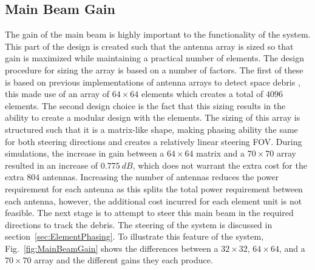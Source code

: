 \documentclass[11pt]{witseiepaper}
\begin{document}
\begin{bibunit}[witseie]
\subsection{Main Beam Gain} \label{sec:MainBeamGain}
The gain of the main beam is highly important to the functionality of the system. This part of the design is created such that the antenna array is sized so that gain is maximized while maintaining a practical number of elements.
The design procedure for sizing the array is based on a number of factors. The first of these is based on previous implementations of antenna arrays to detect space debris \cite{AMISR}, this made use of an array of $64 \times 64$ elements which creates a total of $4096$ elements.
The second design choice is the fact that this sizing results in the ability to create a modular design with the elements. The sizing of this array is structured such that it is a matrix-like shape, making phasing ability the same for both steering directions and creates a relatively linear steering FOV.
During simulations, the increase in gain between a $64 \times 64$ matrix and a $70 \times 70$ array resulted in an increase of $0.775~dB$, which does not warrant the extra cost for the extra $804$ antennas.
Increasing the number of antennas reduces the power requirement for each antenna as this splits the total power requirement between each antenna, however, the additional cost incurred for each element unit is not feasible.
The next stage is to attempt to steer this main beam in the required directions to track the debris. The steering of the system is discussed in section~\ref{sec:ElementPhasing}.
To illustrate this feature of the system, Fig.~\ref{fig:MainBeamGain} shows the differences between a $32 \times 32$, $64 \times 64$, and a $70 \times 70$ array and the different gains they each produce.


\end{bibunit}
\end{document}
